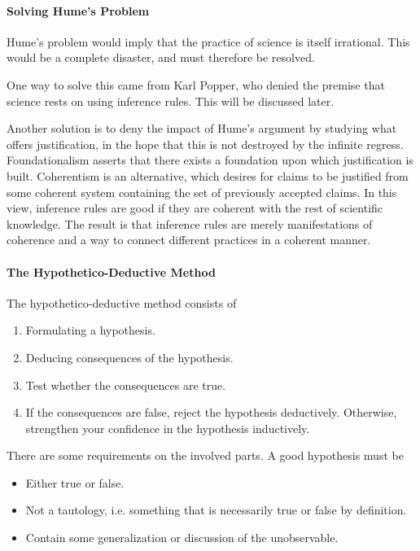 \paragraph{Solving Hume's Problem}
Hume's problem would imply that the practice of science is itself irrational. This would be a complete disaster, and must therefore be resolved.

One way to solve this came from Karl Popper, who denied the premise that science rests on using inference rules. This will be discussed later.

Another solution is to deny the impact of Hume's argument by studying what offers justification, in the hope that this is not destroyed by the infinite regress. Foundationalism asserts that there exists a foundation upon which justification is built. Coherentism is an alternative, which desires for claims to be justified from some coherent system containing the set of previously accepted claims. In this view, inference rules are good if they are coherent with the rest of scientific knowledge. The result is that inference rules are merely manifestations of coherence and a way to connect different practices in a coherent manner.

\paragraph{The Hypothetico-Deductive Method}
The hypothetico-deductive method consists of
\begin{enumerate}
	\item Formulating a hypothesis.
	\item Deducing consequences of the hypothesis.
	\item Test whether the consequences are true.
	\item If the consequences are false, reject the hypothesis deductively. Otherwise, strengthen your confidence in the hypothesis inductively.
\end{enumerate}

There are some requirements on the involved parts. A good hypothesis must be
\begin{itemize}
	\item Either true or false.
	\item Not a tautology, i.e. something that is necessarily true or false by definition.
	\item Contain some generalization or discussion of the unobservable.
\end{itemize}

